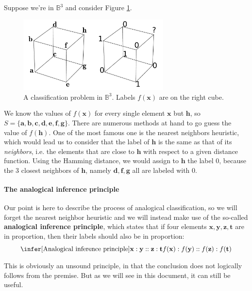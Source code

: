 Suppose we're in $\mathbb{B}^3$ and consider Figure
\ref{FIG:classification_problem}.
\begin{figure}[!h]
\centering
  \includegraphics[width=3in]{figures/classification_problem.pdf}
  \caption{A classification problem in $\mathbb{B}^3$. Labels $f(\mathbf{x})$
  are on the right cube.}
\label{FIG:classification_problem}
\end{figure}
We know the values of $f(\mathbf{x})$ for
every single element $\mathbf{x}$ but $\mathbf{h}$, so $S = \{ \mathbf{a}, \mathbf{b},
\mathbf{c}, \mathbf{d}, \mathbf{e}, \mathbf{f}, \mathbf{g}\}$. There are
numerous methods at hand to go guess the value of $f(\mathbf{h})$. One of the
most famous one is the nearest neighbors heuristic, which would lead us to
consider that the label of $\mathbf{h}$ is the same as  that of its
\textit{neighbors}, i.e. the elements that are close to $\mathbf{h}$ with
respect to a given distance function. Using the Hamming distance, we would
assign to $\mathbf{h}$ the label $0$, because the $3$ closest neighbors of
$\mathbf{h}$, namely $\mathbf{d}, \mathbf{f}, \mathbf{g}$ all are labeled with
$0$.

\paragraph{The analogical inference principle\\}

Our point is here to describe the process of analogical classification, so we
will forget the nearest neighbor heuristic and we will instead make use of the
so-called \textbf{analogical inference principle}, which states that if four
elements $\mathbf{x}, \mathbf{y}, \mathbf{z}, \mathbf{t}$ are in proportion,
then their labels should also be in proportion:
$$
\infer[\text{Analogical inference principle}]{\mathbf{x} : \mathbf{y} ::
\mathbf{z} : \mathbf{t}}{f(\mathbf{x}) : f(\mathbf{y}) :: f(\mathbf{z}) :
f(\mathbf{t})}
$$

This is obviously an unsound principle, in that the conclusion does not
logically follows from the premise. But as we will see in this document, it can
still be useful.

